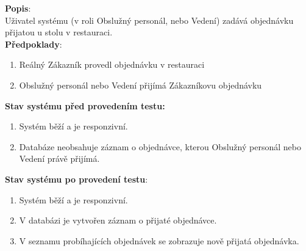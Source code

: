 \textbf{Popis}: \\\indent Uživatel systému (v roli Obslužný personál, nebo Vedení) zadává objednávku přijatou u stolu v restauraci. \\

\textbf{Předpoklady}: 
\begin{enumerate}
	\item Reálný Zákazník provedl objednávku v restauraci
	\item Obslužný personál nebo Vedení přijímá Zákazníkovu objednávku
\end{enumerate}

\textbf{Stav systému před provedením testu:}
\begin{enumerate}
	\item Systém běží a je responzivní.
	\item Databáze neobsahuje záznam o objednávce, kterou Obslužný personál nebo Vedení právě přijímá. 
\end{enumerate}

\textbf{Stav systému po provedení testu}:
\begin{enumerate}
	\item Systém běží a je responzivní.
	\item V databázi je vytvořen záznam o přijaté objednávce.
	\item V seznamu probíhajících objednávek se zobrazuje nově přijatá objednávka.
\end{enumerate}

